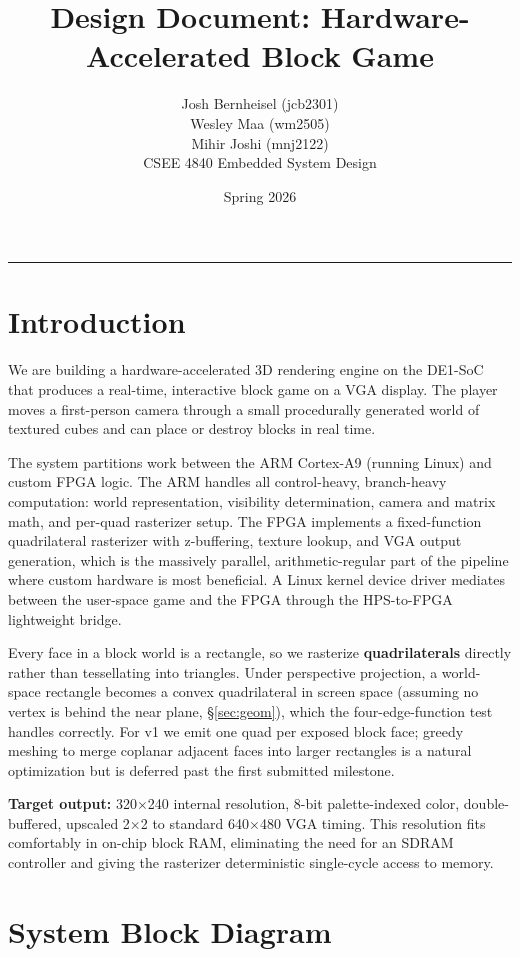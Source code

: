 \documentclass[11pt]{article}
\title{Design Document: Hardware-Accelerated Block Game}
\author{Josh Bernheisel (jcb2301) \\ Wesley Maa (wm2505) \\ Mihir Joshi (mnj2122) \\[0.5em]
CSEE 4840 Embedded System Design}
\date{Spring 2026}
\begin{document}
\maketitle

\tableofcontents
\vspace{1em}
\hrule
\vspace{1em}

\section{Introduction}

We are building a hardware-accelerated 3D rendering engine on the DE1-SoC that produces a real-time, interactive block game on a VGA display. The player moves a first-person camera through a small procedurally generated world of textured cubes and can place or destroy blocks in real time.

The system partitions work between the ARM Cortex-A9 (running Linux) and custom FPGA logic. The ARM handles all control-heavy, branch-heavy computation: world representation, visibility determination, camera and matrix math, and per-quad rasterizer setup. The FPGA implements a fixed-function quadrilateral rasterizer with z-buffering, texture lookup, and VGA output generation, which is the massively parallel, arithmetic-regular part of the pipeline where custom hardware is most beneficial. A Linux kernel device driver mediates between the user-space game and the FPGA through the HPS-to-FPGA lightweight bridge.

Every face in a block world is a rectangle, so we rasterize \textbf{quadrilaterals} directly rather than tessellating into triangles. Under perspective projection, a world-space rectangle becomes a convex quadrilateral in screen space (assuming no vertex is behind the near plane, \S\ref{sec:geom}), which the four-edge-function test handles correctly. For v1 we emit one quad per exposed block face; greedy meshing to merge coplanar adjacent faces into larger rectangles is a natural optimization but is deferred past the first submitted milestone.

\textbf{Target output:} 320$\times$240 internal resolution, 8-bit palette-indexed color, double-buffered, upscaled 2$\times$2 to standard 640$\times$480 VGA timing. This resolution fits comfortably in on-chip block RAM, eliminating the need for an SDRAM controller and giving the rasterizer deterministic single-cycle access to memory.

\section{System Block Diagram}
\end{document}
